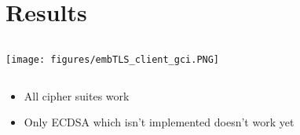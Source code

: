 \section{Results}

\begin{frame}

\begin{columns}





\begin{column}{0.5\textwidth}


\texttt{[image: figures/embTLS\_client\_gci.PNG]}

\end{column}

\end{columns}

\begin{itemize}
  \item All cipher suites work
  \item Only ECDSA which isn't implemented doesn't work yet
\end{itemize}

\end{frame}
